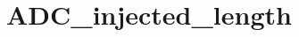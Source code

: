 \hypertarget{group___a_d_c__injected__length}{\section{A\-D\-C\-\_\-injected\-\_\-length}
\label{group___a_d_c__injected__length}
}
